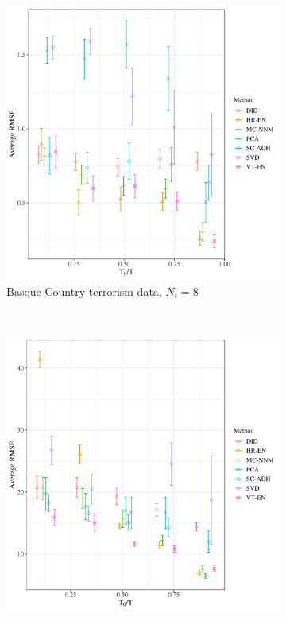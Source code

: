 \documentclass[12pt]{article}
\begin{document}
\begin{figure}[htbp]
	\centering
	\begin{subfigure}[t]{0.48\textwidth}
		\centering
		\includegraphics[width=\textwidth]{plots/basque_N_16_T_43_numruns_20_num_treated_8_simultaneuous_1.png}
		\caption{Basque Country terrorism data, $N_t = 8$} 
	\end{subfigure}
	~ 
	\begin{subfigure}[t]{0.48\textwidth}
		\centering
		\includegraphics[width=\textwidth]{plots/california_N_38_T_31_numruns_20_num_treated_19_simultaneuous_1.png}

\end{subfigure}
\end{figure}
\end{document}
